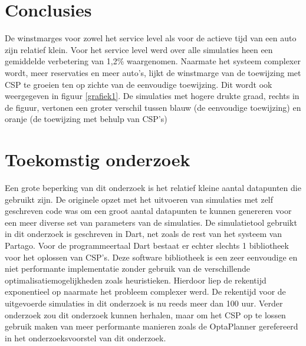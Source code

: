 \documentclass[a0,portrait]{a0poster}
\begin{document}
\begin{multicols}{2}



\color{HoGentAccent1} 
\section*{Conclusies}
\color{black}
De winstmarges voor zowel het service level als voor de actieve tijd van een auto zijn relatief klein. Voor het service level werd over alle simulaties heen een gemiddelde verbetering van 1,2\% waargenomen. Naarmate het systeem complexer wordt, meer reservaties en meer auto's, lijkt de winstmarge van de toewijzing met CSP te groeien ten op zichte van de eenvoudige toewijzing. Dit wordt ook weergegeven in figuur \ref{grafiek1}. De simulaties met hogere drukte graad, rechts in de figuur, vertonen een groter verschil tussen blauw (de eenvoudige toewijzing) en oranje (de toewijzing met behulp van CSP's)
\color{HoGentAccent1} 
\section*{Toekomstig onderzoek}
\color{black}
Een grote beperking van dit onderzoek is het relatief kleine aantal datapunten die gebruikt zijn. De originele opzet met het uitvoeren van simulaties met zelf geschreven code was om een groot aantal datapunten te kunnen genereren voor een meer diverse set van parameters van de simulaties. De simulatietool gebruikt in dit onderzoek is geschreven in Dart, net zoals de rest van het systeem van Partago. Voor de programmeertaal Dart bestaat er echter slechts 1 bibliotheek voor het oplossen van CSP's. Deze software bibliotheek is een zeer eenvoudige en niet performante implementatie zonder gebruik van de verschillende optimalisatiemogelijkheden zoals heuristieken. Hierdoor liep de rekentijd exponentieel op naarmate het probleem complexer werd. De rekentijd voor de uitgevoerde simulaties in dit onderzoek is nu reeds meer dan 100 uur. Verder onderzoek zou dit onderzoek kunnen herhalen, maar om het CSP op te lossen gebruik maken van meer performante manieren zoals de OptaPlanner gerefereerd in het onderzoeksvoorstel van dit onderzoek. 


\end{multicols}
\end{document}
